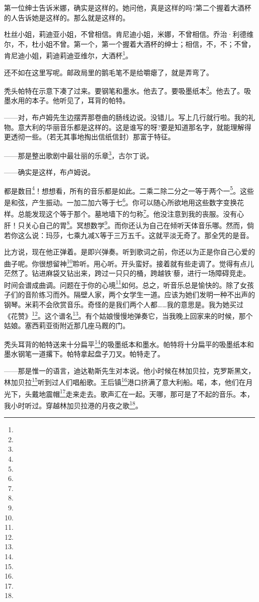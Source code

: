 \par 第一位绅士告诉米娜，确实是这样的。她问他，真是这样的吗?第二个握着大酒杯的人告诉她是这样的。那么就是这样的。
\par 杜丝小姐，莉迪亚小姐，不曾相信。肯尼迪小姐，米娜，不曾相信。乔治·利德维尔，不，杜小姐不曾。第一个，第一个握着大酒杯的绅士；相信，不，不；不曾，肯尼迪小姐，莉迪莉迪亚维尔，大酒杯\footnote{}。
\par 还不如在这里写呢。邮政局里的鹅毛笔不是给嚼瘪了，就是弄弯了。
\par 秃头帕特在示意下凑了过来。要钢笔和墨水。他去了。要吸墨纸本\footnote{}。他去了。吸墨水用的本子。他听见了，耳背的帕特。
\par ——对，布卢姆先生边摆弄那卷曲的肠线边说。没错儿。写上几行就行啦。我的礼物。意大利的华丽音乐都是这样的。这是谁写的呀?要是知道那名字，就能理解得更透彻一些。（若无其事地掏出信纸信封）那富于特征。
\par ——那是整出歌剧中最壮丽的乐章\footnote{}，古尔丁说。
\par ——确实是这样，布卢姆说。
\par 都是数目\footnote{}！想想看，所有的音乐都是如此。二乘二除二分之一等于两个一\footnote{}。这些是和弦，产生振动。一加二加六等于七\footnote{}。你可以随心所欲地用这些数字变换花样。总能发现这个等于那个。墓地墙下的匀称\footnote{}。他没注意到我的丧服。没有心肝！只关心自己的胃\footnote{}。冥想数学\footnote{}。而你还认为自己在倾听天体音乐哪。然而，倘若你这么说：玛莎，七乘九减X等于三万五千。这就平淡无奇了。那全凭的是音。
\par 比方说，现在他正弹着。是即兴弹奏。听到歌词之前，你还以为正是你自己心爱的曲子呢。你很想留神\footnote{}聆听。用心听。开头蛮好。接着就有些走调了。觉得有点儿茫然了。钻进麻袋又钻出来，跨过一只只的桶，跨越铁'藜，进行一场障碍竞走。时间会谱成曲调。问题在于你的心境\footnote{}如何。总之，听音乐总是愉快的。除了女孩子们的音阶练习而外。隔壁人家，两个女学生一道。应该为她们发明一种不出声的钢琴。米莉不会欣赏音乐。奇怪的是我们两个人都……我的意思是。我为她买过《花赞》\footnote{}。这个谱名\footnote{}。有个姑娘慢慢地弹奏它，当我晚上回家来的时候，那个姑娘。塞西莉亚街附近那几座马厩的门。
\par 秃头耳背的帕特送来十分扁平\footnote{}的吸墨纸本和墨水。帕特将十分扁平的吸墨纸本和墨水钢笔一道撂下。帕特拿起盘子刀叉。帕特走了。
\par ——那是惟一的语言，迪达勒斯先生对本说。他小时候在林加贝拉，克罗斯黑文，林加贝拉\footnote{}听到过人们唱船歌。王后镇\footnote{}港口挤满了意大利船。喏，本，他们在月光下，头戴地震帽\footnote{}走来走去。歌声汇在一起。天哪，那可是了不起的音乐。本，我小时听过。穿越林加贝拉港的月夜之歌\footnote{}。
